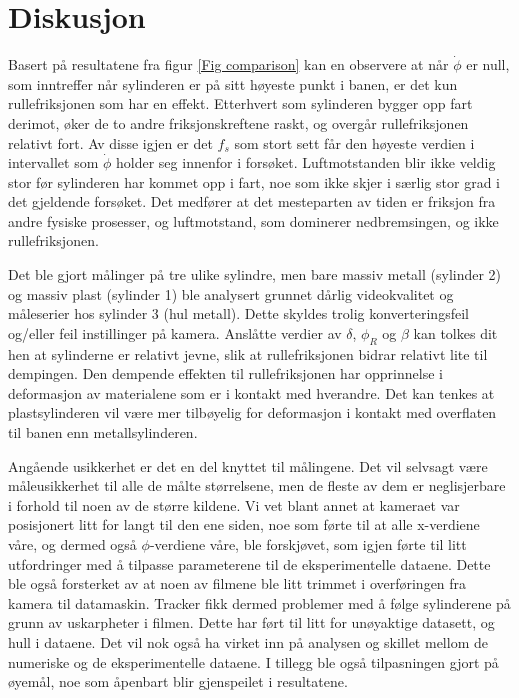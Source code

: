 \documentclass[5p]{elsarticle}
\begin{document}
\section{Diskusjon}
Basert på resultatene fra figur \ref{Fig comparison} kan en observere at når \(\dot{\phi}\) er null, som inntreffer når sylinderen er på sitt høyeste punkt i banen, er det kun rullefriksjonen som har en effekt. Etterhvert som sylinderen bygger opp fart derimot, øker de to andre friksjonskreftene raskt, og overgår rullefriksjonen relativt fort. Av disse igjen er det \(f_s\) som stort sett får den høyeste verdien i intervallet som \(\dot{\phi}\) holder seg innenfor i forsøket. Luftmotstanden blir ikke veldig stor før sylinderen har kommet opp i fart, noe som ikke skjer i særlig stor grad i det gjeldende forsøket. Det medfører at det mesteparten av tiden er friksjon fra andre fysiske prosesser, og luftmotstand, som dominerer nedbremsingen, og ikke rullefriksjonen.
\par
Det ble gjort målinger på tre ulike sylindre, men bare massiv metall (sylinder 2) og massiv plast (sylinder 1) ble analysert grunnet dårlig videokvalitet og måleserier hos sylinder 3 (hul metall). Dette skyldes trolig konverteringsfeil og/eller feil instillinger på kamera. Anslåtte verdier av \(\delta\), \(\phi_R\) og \(\beta\) kan tolkes dit hen at sylinderne er relativt jevne, slik at rullefriksjonen bidrar relativt lite til dempingen. Den dempende effekten til rullefriksjonen har opprinnelse i deformasjon av materialene som er i kontakt med hverandre. Det kan tenkes at plastsylinderen vil være mer tilbøyelig for deformasjon i kontakt med overflaten til banen enn metallsylinderen.
\par
Angående usikkerhet er det en del knyttet til målingene. Det vil selvsagt være måleusikkerhet til alle de målte større\-lsene, men de fleste av dem er neglisjerbare i forhold til noen av de større kildene. Vi vet blant annet at kameraet var posisjonert litt for langt til den ene siden, noe som førte til at alle x-verdiene våre, og dermed også \(\phi\)-verdiene våre, ble forskjøvet, som igjen førte til litt utfordringer med å tilpasse parameterene til de eksperimentelle dataene. Dette ble også forsterket av at noen 
av filmene ble litt trimmet i overføringen fra kamera til datamaskin. Tracker fikk dermed problemer med å følge sylinderene på grunn av uskarpheter i filmen. Dette har ført til litt for unøyaktige datasett, og hull i dataene. Det vil nok også ha virket inn på analysen og skillet mellom de numeriske og de eksperimentelle dataene. I tillegg ble også tilpasningen gjort på øyemål, noe som åpenbart blir gjenspeilet i resultatene.
\end{document}
